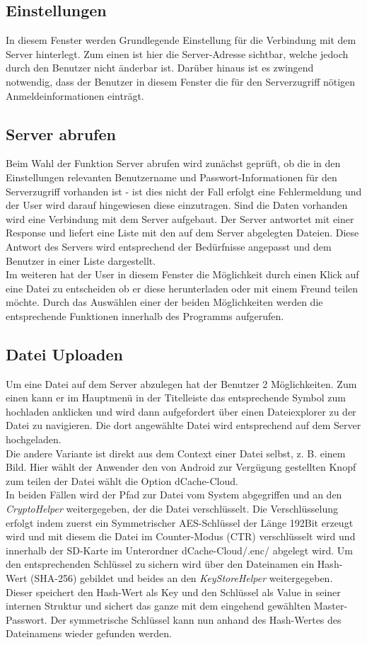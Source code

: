 \documentclass[10pt, a4paper,headsepline]{scrreprt}
\begin{document}
\subsection{Einstellungen}
In diesem Fenster werden Grundlegende Einstellung für die Verbindung mit dem Server hinterlegt. Zum einen ist hier die Server-Adresse sichtbar, welche jedoch durch den Benutzer nicht änderbar ist. Darüber hinaus ist es zwingend notwendig, dass der Benutzer in diesem Fenster die für den Serverzugriff nötigen Anmeldeinformationen einträgt.


\subsection{Server abrufen}
Beim Wahl der Funktion Server abrufen wird zunächst geprüft, ob die in den Einstellungen relevanten Benutzername und Passwort-Informationen für den Serverzugriff vorhanden ist - ist dies nicht der Fall erfolgt eine Fehlermeldung und der User wird darauf hingewiesen diese einzutragen. Sind die Daten vorhanden wird eine Verbindung mit dem Server aufgebaut. Der Server antwortet mit einer Response und liefert eine Liste mit den auf dem Server abgelegten Dateien. Diese Antwort des Servers wird entsprechend der Bedürfnisse angepasst und dem Benutzer in einer Liste dargestellt. \\
Im weiteren hat der User in diesem Fenster die Möglichkeit durch einen Klick auf eine Datei zu entscheiden ob er diese herunterladen oder mit einem Freund teilen möchte. Durch das Auswählen einer der beiden Möglichkeiten werden die entsprechende Funktionen innerhalb des Programms aufgerufen.


\subsection{Datei Uploaden}
Um eine Datei auf dem Server abzulegen hat der Benutzer 2 Möglichkeiten. Zum einen kann er im Hauptmenü in der Titelleiste das entsprechende Symbol zum hochladen anklicken und wird dann aufgefordert über einen Dateiexplorer zu der Datei zu navigieren. Die dort angewählte Datei wird entsprechend auf dem Server hochgeladen. \\
Die andere Variante ist direkt aus dem Context einer Datei selbst, z. B. einem Bild. Hier wählt der Anwender den von Android zur Vergügung gestellten Knopf zum teilen der Datei wählt die Option dCache-Cloud. \\
In beiden Fällen wird der Pfad zur Datei vom System abgegriffen und an den \textit{CryptoHelper} weitergegeben, der die Datei  verschlüsselt. Die Verschlüsselung erfolgt indem zuerst ein Symmetrischer AES-Schlüssel der Länge 192Bit erzeugt wird und mit diesem die Datei im Counter-Modus (CTR) verschlüsselt wird und innerhalb der SD-Karte im Unterordner dCache-Cloud/.enc/ abgelegt wird. Um den entsprechenden Schlüssel zu sichern wird über den Dateinamen ein Hash-Wert (SHA-256) gebildet und beides an den \textit{KeyStoreHelper} weitergegeben. Dieser speichert den  Hash-Wert als Key und den Schlüssel als Value in seiner internen Struktur und sichert das ganze mit dem eingehend gewählten Master-Passwort. Der symmetrische Schlüssel kann nun anhand des Hash-Wertes des Dateinamens wieder gefunden werden.
\end{document}
